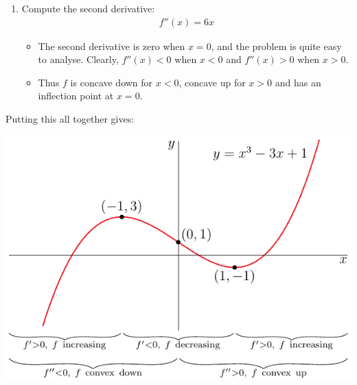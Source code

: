 \begin{eg}[Sketch $f(x)=x^3-3x+1$]
\begin{enumerate}[(1)]
\item Compute the second derivative:
\begin{align*}
f''(x) = 6x
\end{align*}
\begin{itemize}
 \item The second derivative is zero when $x=0$, and the problem is quite easy to
analyse. Clearly, $f''(x)<0$ when $x<0$ and $f''(x)>0$ when $x>0$.
\item Thus $f$ is concave down for $x<0$, concave up for $x>0$ and has an inflection
point at $x=0$.
\end{itemize}
\end{enumerate}
Putting this all together gives:
\begin{efig}
\begin{center}
   \includegraphics{sketch1}
\end{center}
\end{efig}
\end{eg}
\goodbreak


